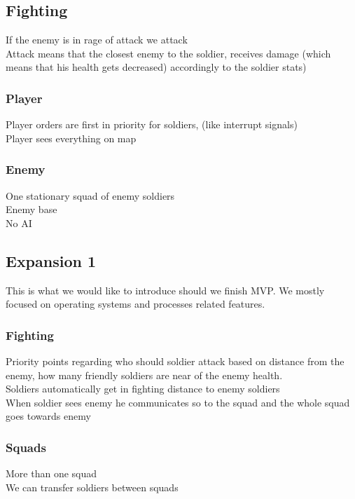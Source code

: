 \documentclass{article}
\begin{document}
\subsection{Fighting}
If the enemy is in rage of attack we attack \\
Attack means that the closest enemy to the soldier, receives damage (which means that his health gets decreased) accordingly to the soldier stats)

\subsubsection{Player}
Player orders are first in priority for soldiers, (like interrupt signals) \\ 
Player sees everything on map

\subsubsection{Enemy}
One stationary squad of enemy soldiers \\ 
Enemy base \\ 
No AI \\

\subsection{Expansion 1}
This is what we would like to introduce should we finish MVP. We mostly focused on operating systems and processes related features. 

\subsubsection{Fighting}
Priority points regarding who should soldier attack based on distance from the enemy, how many friendly soldiers are near of the enemy health. \\ 
Soldiers automatically get in fighting distance to enemy soldiers \\ 
When soldier sees enemy he communicates so to the squad and the whole squad goes towards enemy

\subsubsection{Squads}
More than one squad \\ 
We can transfer soldiers between squads 
\end{document}
